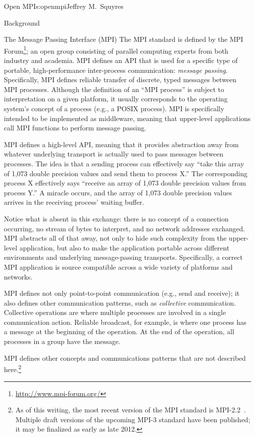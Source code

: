 \begin{aosachapter}{Open MPI}{s:openmpi}{Jeffrey M.\ Squyres}
\begin{aosasect1}{Background}
\begin{aosasect2}{The Message Passing Interface (MPI)}
The MPI standard is defined by the MPI
Forum\footnote{\url{http://www.mpi-forum.org/}}; an open group
consisting of parallel computing experts from both industry and
academia.
%
MPI defines an API that is used for a specific type of portable,
high-performance inter-process communication: {\em message passing}.
Specifically, MPI defines reliable transfer of discrete, typed
messages between MPI processes.  
%
Although the definition of an ``MPI process'' is subject to
interpretation on a given platform, it usually corresponds to the
operating system's concept of a process (e.g., a POSIX process).
%
MPI is specifically intended to be implemented as middleware, meaning
that upper-level applications call MPI functions to perform message
passing.

MPI defines a high-level API, meaning that it provides abstraction
away from whatever underlying transport is actually used to pass
messages between processes.  The idea is that a sending process can
effectively say ``take this array of 1,073 double precision values and
send them to process X.''  The corresponding process X effectively
says ``receive an array of 1,073 double precision values from process
Y.''  A miracle occurs, and the array of 1,073 double precision values
arrives in the receiving process' waiting buffer.

Notice what is absent in this exchange: there is no concept of a
connection occurring, no stream of bytes to interpret, and no network
addresses exchanged.  MPI abstracts all of that away, not only to hide
such complexity from the upper-level application, but also to make the
application portable across different environments and underlying
message-passing transports.  Specifically, a correct MPI application
is source compatible across a wide variety of platforms and networks.

MPI defines not only point-to-point communication (e.g., send and
receive); it also defines other communication patterns, such as {\em
  collective} communication.  Collective operations are where multiple
processes are involved in a single communication action.  Reliable
broadcast, for example, is where one process has a message at the
beginning of the operation. At the end of the operation, all processes
in a group have the message.

MPI defines other concepts and communications patterns that are not
described here.\footnote{As of this writing, the most recent version
  of the MPI standard is MPI-2.2~\cite{mpi-2.2}.  Multiple draft
  versions of the upcoming MPI-3 standard have been published; it may
  be finalized as early as late 2012.}


\end{aosasect2}
\end{aosasect1}
\end{aosachapter}
